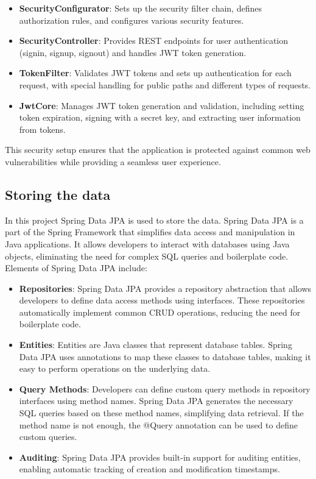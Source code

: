 \begin{itemize}
    \item \textbf{SecurityConfigurator}: Sets up the security filter chain, defines authorization rules, and configures various security features.

    \item \textbf{SecurityController}: Provides REST endpoints for user authentication (signin, signup, signout) and handles JWT token generation.

    \item \textbf{TokenFilter}: Validates JWT tokens and sets up authentication for each request, with special handling for public paths and different types of requests.

    \item \textbf{JwtCore}: Manages JWT token generation and validation, including setting token expiration, signing with a secret key, and extracting user information from tokens.
\end{itemize}

This security setup ensures that the application is protected against common web vulnerabilities while providing a seamless user experience.


\subsection{Storing the data}\label{subsec:storing-the-data}
In this project Spring Data JPA is used to store the data.
Spring Data JPA is a part of the Spring Framework that simplifies data access and manipulation in Java applications.
It allows developers to interact with databases using Java objects, eliminating the need for complex SQL queries and boilerplate code.
Elements of Spring Data JPA include:
\begin{itemize}
    \item \textbf{Repositories}: Spring Data JPA provides a repository abstraction that allows developers to define data access methods using interfaces.
    These repositories automatically implement common CRUD operations, reducing the need for boilerplate code.

    \item \textbf{Entities}: Entities are Java classes that represent database tables.
    Spring Data JPA uses annotations to map these classes to database tables, making it easy to perform operations on the underlying data.

    \item \textbf{Query Methods}: Developers can define custom query methods in repository interfaces using method names.
    Spring Data JPA generates the necessary SQL queries based on these method names, simplifying data retrieval.
    If the method name is not enough, the @Query annotation can be used to define custom queries.

    \item \textbf{Auditing}: Spring Data JPA provides built-in support for auditing entities, enabling automatic tracking of creation and modification timestamps.
\end{itemize}

